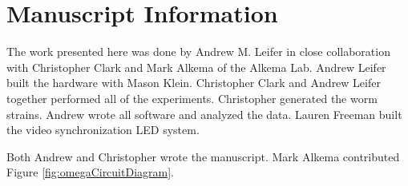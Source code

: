 \section{Manuscript Information}
The work presented here was done by Andrew M. Leifer in close collaboration with Christopher Clark and Mark Alkema of the Alkema Lab. Andrew Leifer built the hardware with Mason Klein. Christopher Clark and Andrew Leifer together performed all of the experiments. Christopher generated the worm strains. Andrew wrote all software and analyzed the data. Lauren Freeman built the video synchronization LED system. 

Both Andrew and Christopher wrote the manuscript. Mark Alkema contributed Figure \ref{fig:omegaCircuitDiagram}.

